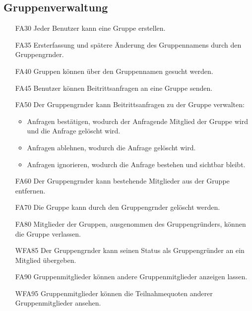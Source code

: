 \documentclass{scrartcl}
\begin{document}
	\subsection{Gruppenverwaltung}
	\begin{itemize}
		\item[FA30] Jeder Benutzer kann eine Gruppe erstellen.
		\item[FA35] Ersterfassung und spätere Änderung des Gruppennamens durch den \gls{Gruppengrnder}.
		\item[FA40] Gruppen können über den Gruppennamen gesucht werden.
		\item[FA45] Benutzer können Beitrittsanfragen an eine Gruppe senden.
		\item[FA50] Der \gls{Gruppengrnder} kann Beitrittsanfragen zu der Gruppe verwalten:
		\begin{itemize}
			\item Anfragen bestätigen, wodurch der Anfragende \gls{Mitglied} der Gruppe wird und die Anfrage gelöscht wird.
		\end{itemize}
		\begin{itemize}
			\item Anfragen ablehnen, wodurch die Anfrage gelöscht wird.
		\end{itemize}
		\begin{itemize}
			\item Anfragen ignorieren, wodurch die Anfrage bestehen und sichtbar bleibt.
		\end{itemize}
		\item[FA60] Der \gls{Gruppengrnder} kann bestehende Mitglieder aus der Gruppe entfernen.
		\item[FA70] Die Gruppe kann durch den \gls{Gruppengrnder} gelöscht werden.
		\item[FA80] Mitglieder der Gruppen, ausgenommen des Gruppengründers, können die Gruppe verlassen.
		\item[WFA85] Der \gls{Gruppengrnder} kann seinen Status als Gruppengründer an ein \gls{Mitglied} übergeben.
		\item[FA90] Gruppenmitglieder können andere Gruppenmitglieder anzeigen lassen.
		\item[WFA95] Gruppenmitglieder können die Teilnahmequoten anderer Gruppenmitglieder ansehen.
		
	\end{itemize}
	
\end{document}
